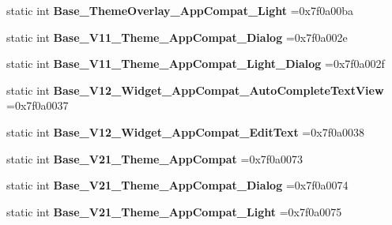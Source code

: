 \begin{DoxyCompactItemize}
static int {\bfseries Base\+\_\+\+Theme\+Overlay\+\_\+\+App\+Compat\+\_\+\+Light} =0x7f0a00ba
\item 
\mbox{\label{classandroid_1_1support_1_1design_1_1R_1_1style_ae3b4c74e25a4be787e47da52829eb5c9}} 
static int {\bfseries Base\+\_\+\+V11\+\_\+\+Theme\+\_\+\+App\+Compat\+\_\+\+Dialog} =0x7f0a002e
\item 
\mbox{\label{classandroid_1_1support_1_1design_1_1R_1_1style_a103d093afb465aaf4f140dba09f79555}} 
static int {\bfseries Base\+\_\+\+V11\+\_\+\+Theme\+\_\+\+App\+Compat\+\_\+\+Light\+\_\+\+Dialog} =0x7f0a002f
\item 
\mbox{\label{classandroid_1_1support_1_1design_1_1R_1_1style_a581f7013b95a0eca54eb6e57462224a0}} 
static int {\bfseries Base\+\_\+\+V12\+\_\+\+Widget\+\_\+\+App\+Compat\+\_\+\+Auto\+Complete\+Text\+View} =0x7f0a0037
\item 
\mbox{\label{classandroid_1_1support_1_1design_1_1R_1_1style_a90b1444ab77235b5fa8019097c7ba3ce}} 
static int {\bfseries Base\+\_\+\+V12\+\_\+\+Widget\+\_\+\+App\+Compat\+\_\+\+Edit\+Text} =0x7f0a0038
\item 
\mbox{\label{classandroid_1_1support_1_1design_1_1R_1_1style_af74059f789c7493045428666ac8bb1eb}} 
static int {\bfseries Base\+\_\+\+V21\+\_\+\+Theme\+\_\+\+App\+Compat} =0x7f0a0073
\item 
\mbox{\label{classandroid_1_1support_1_1design_1_1R_1_1style_a17c036d373eda0fbd1c11b6d3b23d5c4}} 
static int {\bfseries Base\+\_\+\+V21\+\_\+\+Theme\+\_\+\+App\+Compat\+\_\+\+Dialog} =0x7f0a0074
\item 
\mbox{\label{classandroid_1_1support_1_1design_1_1R_1_1style_a87d0e3aee704ffead3060d778c1fc9ca}} 
static int {\bfseries Base\+\_\+\+V21\+\_\+\+Theme\+\_\+\+App\+Compat\+\_\+\+Light} =0x7f0a0075
\item 
\mbox{\label{classandroid_1_1support_1_1design_1_1R_1_1style_a177a5cf8220f0cdb696cacc785c80c70}} 

\end{DoxyCompactItemize}

